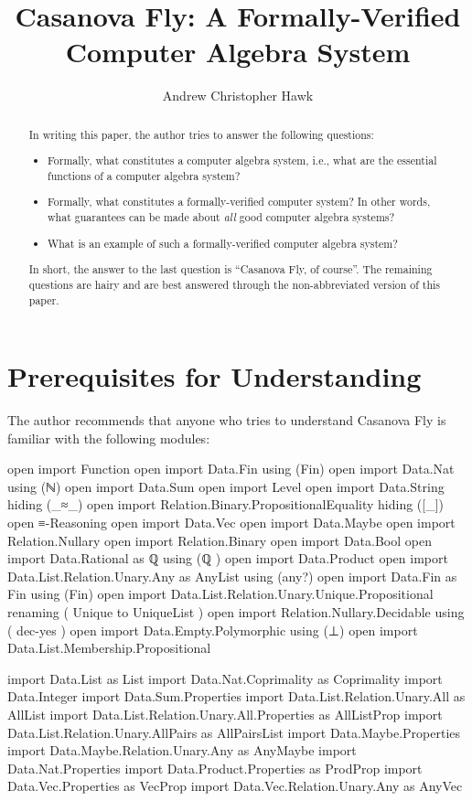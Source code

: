 \documentclass{report}
\title{Casanova Fly: A Formally-Verified Computer Algebra System}
\author{Andrew Christopher Hawk}
\begin{document}
\maketitle{}

\begin{abstract}
In writing this paper, the author tries to answer the following questions:

\begin{itemize}
  \item Formally, what constitutes a computer algebra system, i.e., what are the essential functions of a computer algebra system?
  \item Formally, what constitutes a formally-verified computer system?  In other words, what guarantees can be made about \emph{all} good computer algebra systems?
  \item What is an example of such a formally-verified computer algebra system?
\end{itemize}

In short, the answer to the last question is ``Casanova Fly, of course''.  The remaining questions are hairy and are best answered through the non-abbreviated version of this paper.
\end{abstract}

\tableofcontents

\chapter{Prerequisites for Understanding}
The author recommends that anyone who tries to understand Casanova Fly is familiar with the following modules:

\begin{code}
open import Function
open import Data.Fin using (Fin)
open import Data.Nat using (ℕ)
open import Data.Sum
open import Level
open import Data.String hiding (_≈_)
open import Relation.Binary.PropositionalEquality hiding ([_])
open ≡-Reasoning
open import Data.Vec
open import Data.Maybe
open import Relation.Nullary
open import Relation.Binary
open import Data.Bool
open import Data.Rational
  as ℚ
  using (ℚ
        )
open import Data.Product
open import Data.List.Relation.Unary.Any as AnyList using (any?)
open import Data.Fin as Fin using (Fin)
open import Data.List.Relation.Unary.Unique.Propositional
  renaming
    ( Unique to UniqueList
    )
open import Relation.Nullary.Decidable
  using
    ( dec-yes
    )
open import Data.Empty.Polymorphic using (⊥)
open import Data.List.Membership.Propositional

import Data.List as List
import Data.Nat.Coprimality as Coprimality
import Data.Integer
import Data.Sum.Properties
import Data.List.Relation.Unary.All as AllList
import Data.List.Relation.Unary.All.Properties as AllListProp
import Data.List.Relation.Unary.AllPairs as AllPairsList
import Data.Maybe.Properties
import Data.Maybe.Relation.Unary.Any as AnyMaybe
import Data.Nat.Properties
import Data.Product.Properties as ProdProp
import Data.Vec.Properties as VecProp
import Data.Vec.Relation.Unary.Any as AnyVec
\end{code}
\end{document}
